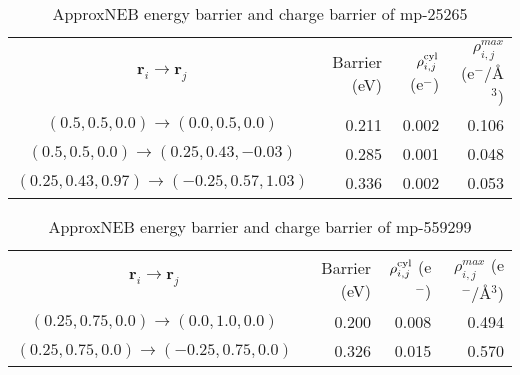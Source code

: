 \documentclass[reprint,preprintnumbers,amsmath,amssymb,aps,prl]{revtex4-1}
\begin{document}
\begin{table}[h]
    \centering
    \caption{ApproxNEB energy barrier and charge barrier of mp-25265}
    \begin{ruledtabular}
        \begin{tabular}{crrr}
            $\bm{r}_i \rightarrow \bm{r}_j$                     & Barrier (eV) & $\rho^{\rm cyl}_{i,j}$ (e$^{-}$) & $\rho^{max}_{i,j}$ (e$^{-}$/\AA{}$^3$)\\
            \colrule
            $(0.5, 0.5, 0.0)\rightarrow(0.0, 0.5, 0.0) $        & 0.211        & 0.002                            & 0.106          \\
            $(0.5, 0.5, 0.0)\rightarrow(0.25, 0.43, -0.03) $    & 0.285        & 0.001                            & 0.048          \\
            $(0.25, 0.43, 0.97)\rightarrow(-0.25, 0.57, 1.03) $ & 0.336        & 0.002                            & 0.053          \\
        \end{tabular}
    \end{ruledtabular}
\end{table}

\begin{table}[h]
    \centering
    \caption{ApproxNEB energy barrier and charge barrier of mp-559299}
    \begin{ruledtabular}
        \begin{tabular}{crrr}
            $\bm{r}_i \rightarrow \bm{r}_j$                   & Barrier (eV) & $\rho^{\rm cyl}_{i,j}$ (e$^{-}$) & $\rho^{max}_{i,j}$ (e$^{-}$/\AA{}$^3$)\\
            \colrule
            $(0.25, 0.75, 0.0)\rightarrow(0.0, 1.0, 0.0) $    & 0.200        & 0.008                            & 0.494          \\
            $(0.25, 0.75, 0.0)\rightarrow(-0.25, 0.75, 0.0) $ & 0.326        & 0.015                            & 0.570          \\
        \end{tabular}
    \end{ruledtabular}
\end{table}
\end{document}
